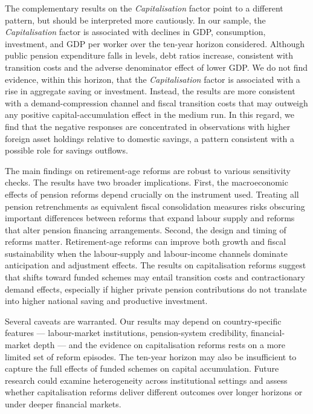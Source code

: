 \documentclass[11pt,english,a4paper, twoside, authoryear]{article}
\begin{document}
The complementary results on the \emph{Capitalisation} factor point to a different pattern, but should be interpreted more cautiously. In our sample, the \emph{Capitalisation} factor is associated with declines in GDP, consumption, investment, and GDP per worker over the ten-year horizon considered. Although public pension expenditure falls in levels, debt ratios increase, consistent with transition costs and the adverse denominator effect of lower GDP. We do not find evidence, within this horizon, that the \emph{Capitalisation} factor is associated with a rise in aggregate saving or investment. Instead, the results are more consistent with a demand-compression channel and fiscal transition costs  that may outweigh any positive capital-accumulation effect in the medium run. In this regard,  we find that the negative responses are concentrated in observations with higher foreign asset holdings relative to domestic savings, a pattern consistent with a possible role for savings outflows.

The main findings on retirement-age reforms are robust to various sensitivity checks. The results have two broader implications. First, the macroeconomic effects of pension reforms depend crucially on the instrument used. Treating all pension retrenchments as equivalent fiscal consolidation measures risks obscuring important differences between reforms that expand labour supply and reforms that alter pension financing arrangements. Second, the design and timing of reforms matter. Retirement-age reforms can improve both growth and fiscal sustainability when the labour-supply and labour-income channels dominate anticipation and adjustment effects. The results on capitalisation reforms suggest that shifts toward funded schemes may entail transition costs and contractionary demand effects, especially if higher private pension contributions do not translate into higher national saving and productive investment. %

Several caveats are warranted. Our results may depend on country-specific features --- labour-market institutions, pension-system credibility, financial-market depth --- and the evidence on capitalisation reforms rests on a more limited set of reform episodes. The ten-year horizon may also be insufficient to capture the full effects of funded schemes on capital accumulation. Future research could examine heterogeneity across institutional settings and assess whether capitalisation reforms deliver different outcomes over longer horizons or under deeper financial markets.
\end{document}
